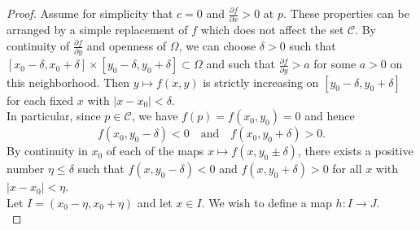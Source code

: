 \documentclass[reqno]{amsart}
\theoremstyle{plain}%
\theoremstyle{definition}
\theoremstyle{remark}
\begin{document}
\begin{proof}
    Assume for simplicity that $c=0$ and $\frac{\partial f}{\partial x} > 0$ at
    $p$. These properties can be arranged by a simple replacement of
    $f$ which does not affect the set $\mathcal{C}$.
    By continuity of $\frac{\partial f}{\partial y}$ and openness of $\Omega$,
    we can choose $\delta > 0$ such that
    $\left[ x_0- \delta, x_0 + \delta \right] \times \left[ 
    y_0 - \delta, y_0 + \delta \right] \subset \Omega $ and such that
    $\frac{\partial f}{\partial y} > a$  for some $a > 0$ on this neighborhood.
    Then $y \mapsto f(x,y)$ is strictly increasing on 
    $\left[ y_0 - \delta, y_0 + \delta \right] $ for each fixed
    $x$ with $\left| x-x_0 \right| < \delta$.\\
    In particular, since $p \in \mathcal{C}$, we have
    $f(p) = f\left( x_0, y_0 \right) =0$ and hence
    \[
    f\left( x_0, y_0 - \delta \right) <0 \quad \text{and} \quad
    f\left( x_0, y_0 + \delta \right) >0.
    \] 
    By continuity in $x_0$ of each of the maps $x \mapsto f(x, y_0 \pm
    \delta)$, there exists a positive number $\eta \le \delta$ such that
    $f\left( x, y_0- \delta \right) <0$ and
    $f\left( x, y_0+ \delta \right) >0$ for all $x$ with
    $\left| x - x_0 \right|  < \eta$.\\
    Let $I = \left( x_0 - \eta, x_0 + \eta \right) $ and let
    $x \in I$. We wish to define a map $h  \colon I \to J$.\\
    

\end{proof}
\end{document}
